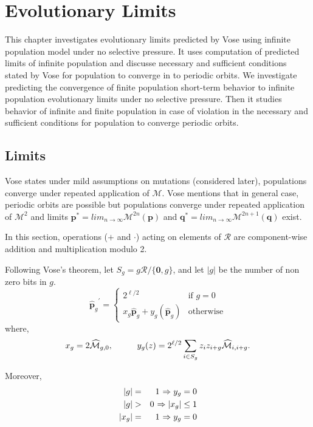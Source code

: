 \chapter{Evolutionary Limits} \label{ch:evolutionary limits}
This chapter investigates evolutionary limits predicted by Vose using infinite population model under no selective pressure. 
It uses computation of predicted limits of infinite population and discusse necessary and sufficient conditions stated by Vose for 
population to converge in to periodic orbits. We investigate predicting the convergence of finite population short-term behavior to infinite population evolutionary limits under no selective pressure. Then it studies behavior of infinite and finite population in case of violation in the necessary and sufficient conditions 
for population to converge periodic orbits.

\section{Limits}
\label{Limits}
Vose states under mild assumptions on mutations (considered later), populations converge under repeated application 
of $\mathcal{M}$. Vose mentions that in general case, periodic orbits are possible but populations converge under 
repeated application of $\mathcal{M}^2$ and limits ${\bm p}^\ast = lim_{n \rightarrow \infty} \mathcal{M}^{2n}({\bm p})$ 
and ${\bm q}^\ast = lim_{n \rightarrow \infty} \mathcal{M}^{2n+1}({\bm q})$ exist.

In this section, operations ($+$ and $\cdot$) acting on elements of $\mathcal{R}$ are component-wise addition and multiplication modulo 2. 

Following Vose's theorem, let $S_g = g \mathcal{R} / \{\textbf{0}, g\}$, and let $|g|$ be the number of non zero bits in $g$.
\[
{{\widehat{{\bm p}}}_g}^{\prime}  = \begin{cases}
    2^{\ell /2}  & \text{if $g = 0$}\\
    x_g \widehat{{\bm p}}_g + y_g(\widehat{{\bm p}}_g) & \text{otherwise}
  \end{cases}
\]
where,
\[
x_g = 2\widehat{\mathcal{M}}_{g,0},  \hspace*{1cm} y_g(z) = 2^{\ell /2} \sum_{i \in S_g} z_i z_{i+g} \widehat{\mathcal{M}}_{i,i+g}.
\]

Moreover, 
\begin{eqnarray*}
|g| & = & 1 \hspace{0.01in} \Rightarrow y_g = 0 \\
|g| & > & 0 \hspace{0.01in} \Rightarrow |x_g| \leq 1 \\
|x_g| & = & 1 \hspace{0.01in} \Rightarrow y_g = 0
\end{eqnarray*}

